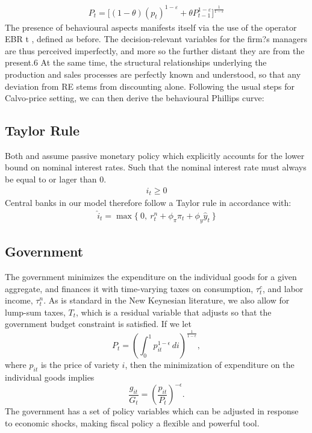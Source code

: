 \documentclass[11pt]{article}
\newcommand{\bb}{\bigbreak\noindent}
\begin{document}
\begin{spacing}{2}
\begin{align}
	P_t = \big[ (1- \theta)(p_t)^{1-\varepsilon} + \theta P_{t-1}^{1-\varepsilon}  \big] ^{\frac{1}{1-\varepsilon}}
\end{align}
The presence of behavioural aspects manifests itself via the use of the operator EBR t , defined as before. The decision-relevant variables for the firm?s managers are thus perceived imperfectly, and more so the further distant they are from the present.6 At the same time, the structural relationships underlying the production and sales processes are perfectly known and understood, so that any deviation from RE stems from discounting alone.
\bb
Following the usual steps for Calvo-price setting, we can then derive the behavioural Phillips curve:

\subsection{Taylor Rule}
Both \cite{eggertsson2011fiscal} and \cite{correia2013unconventional} assume passive monetary policy which explicitly accounts for the lower bound on nominal interest rates. Such that the nominal interest rate must always be equal to or lager than 0. 
\begin{align*}
	i_t \geq 0
\end{align*}
Central banks in our model therefore follow a Taylor rule in accordance with: 
\begin{align}
	\hat{i}_t = \max \{ \: 0, \: r_t^n + \phi_\pi \pi_t + \phi_y \hat{y}_t \: \} 
\end{align}

\subsection{Government}
The government minimizes the expenditure on the individual goods for a given aggregate, and finances it with time-varying taxes on consumption, \(\tau_t^c\), and labor income, \(\tau_t^n\). As is standard in the New Keynesian literature, we also allow for lump-sum taxes, \(T_t\), which is a residual variable that adjusts so that the government budget constraint is satisfied. If we let 
\[
P_t = \left(\int_0^1 p_{it}^{1-\epsilon} \, di \right)^{\frac{1}{1-\epsilon}},
\]
where \(p_{it}\) is the price of variety \(i\), then the minimization of expenditure on the individual goods implies 
\[
\frac{g_{it}}{G_t} = \left(\frac{p_{it}}{P_t}\right)^{-\epsilon}.
\]
The government has a set of policy variables which can be adjusted in response to economic shocks, making fiscal policy a flexible and powerful tool.


\end{spacing}
\end{document}
